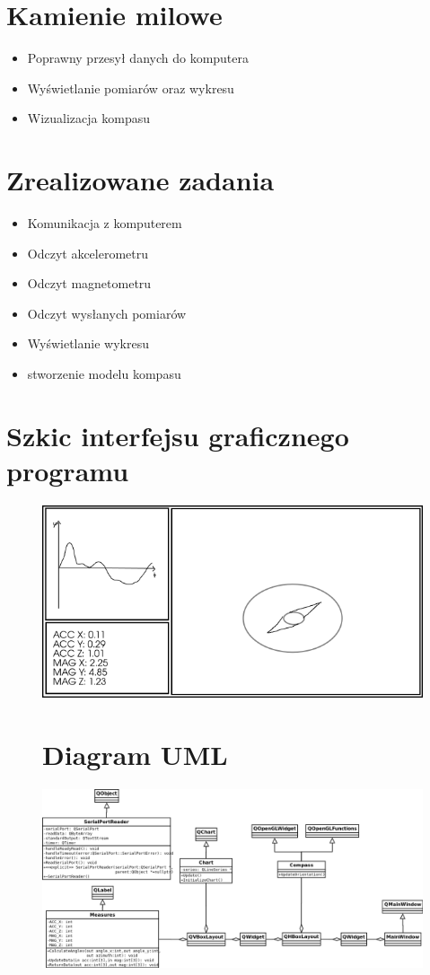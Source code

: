 \documentclass{article}
\begin{document}
\section{Kamienie milowe}
\begin{itemize}[noitemsep]
\item Poprawny przesył danych do komputera
\item Wyświetlanie pomiarów oraz wykresu
\item Wizualizacja kompasu
\end{itemize}

\section{Zrealizowane zadania}
\begin{itemize}[noitemsep]
\item Komunikacja z komputerem
\item Odczyt akcelerometru
\item Odczyt magnetometru
\item Odczyt wysłanych pomiarów
\item Wyświetlanie wykresu
\item stworzenie modelu kompasu
\end{itemize}

\section{Szkic interfejsu graficznego programu}
\begin{figure}[H]
  \centering
  \includegraphics[width=0.75\linewidth]{layout.png}
\end{figure}

\begin{figure}[H]
\section{Diagram UML}
  \centering
  \includegraphics[width=0.75\linewidth]{Diagram1.png}
\end{figure}
\end{document}
